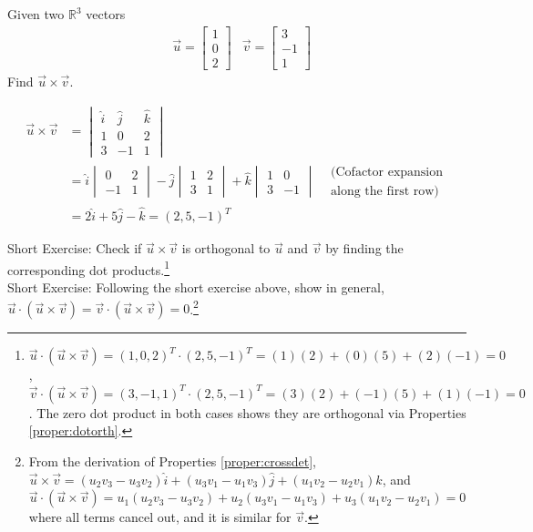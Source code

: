 \begin{exmp}
Given two $\mathbb{R}^3$ vectors
\begin{align*}
&\vec{u} =
\begin{bmatrix}
1 \\
0 \\
2
\end{bmatrix}
&\vec{v} =
\begin{bmatrix}
3 \\
-1 \\
1
\end{bmatrix}
\end{align*}
Find $\vec{u} \times \vec{v}$.
\end{exmp}
\begin{solution}
\begin{align*}
\vec{u} \times \vec{v} &=
\begin{vmatrix}
\hat{i} & \hat{j} & \hat{k} \\
1 & 0 & 2 \\
3 & -1 & 1
\end{vmatrix} \\
&= 
\hat{i}
\begin{vmatrix}
0 & 2 \\
-1 & 1 
\end{vmatrix}
- \hat{j}
\begin{vmatrix}
1 & 2 \\
3 & 1 
\end{vmatrix}
+ \hat{k}
\begin{vmatrix}
1 & 0 \\
3 & -1 
\end{vmatrix}
& \begin{aligned}
\text{(Cofactor expansion} \\ 
\text{along the first row)}
\end{aligned}\\
&= 2\hat{i} + 5\hat{j} - \hat{k} = (2,5,-1)^T
\end{align*} 
\end{solution}
Short Exercise: Check if $\vec{u} \times \vec{v}$ is orthogonal to $\vec{u}$ and $\vec{v}$ by finding the corresponding dot products.\footnote{$\vec{u} \cdot (\vec{u} \times \vec{v}) = (1,0,2)^T\cdot(2,5,-1)^T = (1)(2) + (0)(5) + (2)(-1) = 0$, $\vec{v} \cdot (\vec{u} \times \vec{v}) = (3,-1,1)^T\cdot(2,5,-1)^T = (3)(2) + (-1)(5) + (1)(-1) = 0$. The zero dot product in both cases  shows they are orthogonal via Properties \ref{proper:dotorth}.}\\
Short Exercise: Following the short exercise above, show in general, $\vec{u} \cdot (\vec{u} \times \vec{v}) = \vec{v} \cdot (\vec{u} \times \vec{v}) = 0$.\footnote{From the derivation of Properties \ref{proper:crossdet}, $\vec{u} \times \vec{v} = (u_2v_3 - u_3v_2)\hat{i} + (u_3v_1 - u_1v_3)\hat{j} + (u_1v_2 - u_2v_1)\hat{k}$, and $\vec{u} \cdot (\vec{u} \times \vec{v}) = u_1(u_2v_3 - u_3v_2) + u_2(u_3v_1 - u_1v_3) + u_3(u_1v_2 - u_2v_1) = 0$ where all terms cancel out, and it is similar for $\vec{v}$.}


